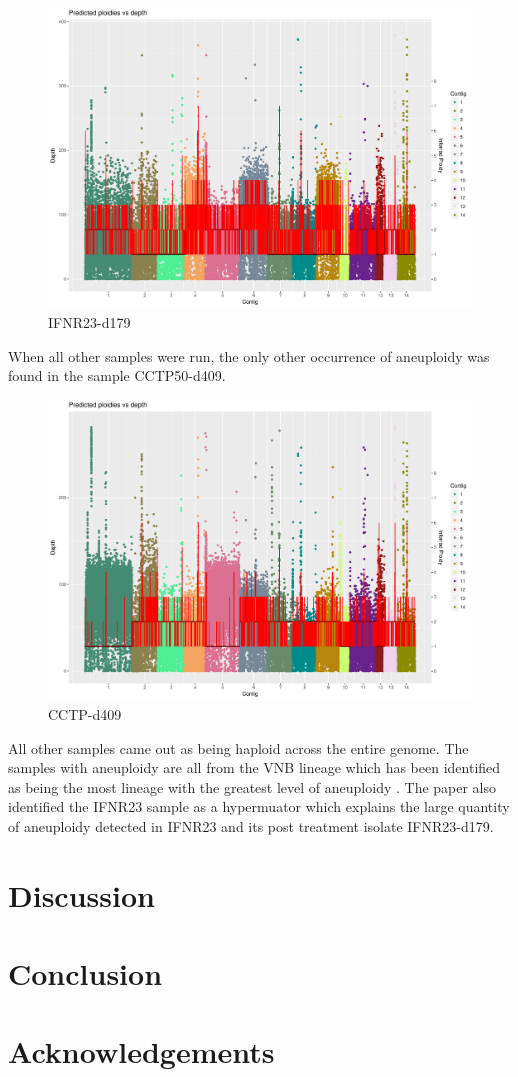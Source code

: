 \documentclass[11pt]{article}
\begin{document}
\begin{figure}[H]
\begin{center}
\caption{IFNR23-d179}
\includegraphics[scale=0.5]{Plots/Sample_15_plot.pdf}
\end{center}
\end{figure}
When all other samples were run, the only other occurrence of aneuploidy was found in the sample CCTP50-d409.
\begin{figure}[H]
\begin{center}
\caption{CCTP-d409}
\includegraphics[scale=0.5]{Plots/Sample_6_plot.pdf}
\end{center}
\end{figure}
All other samples came out as being haploid across the entire genome. The samples with aneuploidy are all from the VNB lineage which has been identified as being the most lineage with the greatest level of aneuploidy \autocite{Rhodes2017}. The paper also identified the IFNR23 sample as a hypermuator which explains the large quantity of aneuploidy detected in IFNR23 and its post treatment isolate IFNR23-d179.   
\section{Discussion}
\section{Conclusion}
\section{Acknowledgements}

\pagebreak 
\printbibliography
\pagebreak
\end{document}
